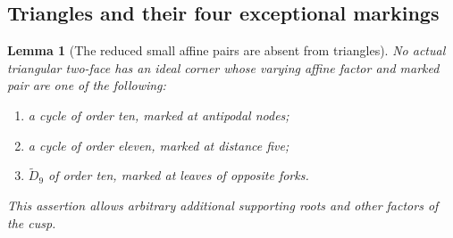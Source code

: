 \documentclass[11pt]{article}
\newtheorem{lemma}[theorem]{Lemma}
\theoremstyle{remark}\newtheorem{remark}[theorem]{Remark}
\begin{document}
\subsection{Triangles and their four exceptional markings}

\begin{lemma}[The reduced small affine pairs are absent from triangles]
\label{lem:current-affine-triangle-exclusions}
No actual triangular two-face has an ideal corner whose varying affine
factor and marked pair are one of the following:
\begin{enumerate}
\item a cycle of order ten, marked at antipodal nodes;
\item a cycle of order eleven, marked at distance five;
\item $\widetilde D_9$ of order ten, marked at leaves of opposite forks.
\end{enumerate}
This assertion allows arbitrary additional supporting roots and other
factors of the cusp.
\end{lemma}
\end{document}
